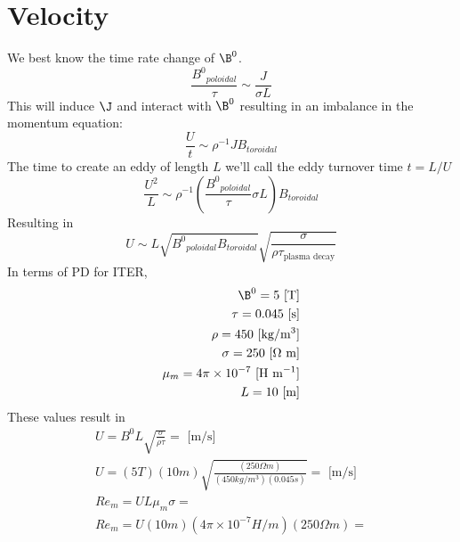 \documentclass[11pt]{article}
\begin{document}
\doublespacing
\MOONSTITLE
\maketitle

\section{Velocity}
We best know the time rate change of $\B^0$.
\begin{equation}
	\frac{{B^0}_{poloidal}}{\tau} \sim \frac{J}{\sigma L}
\end{equation}
This will induce $\J$ and interact with $\B^0$ resulting in an imbalance in the momentum equation:
\begin{equation}
	\frac{U}{t} \sim \rho^{-1} J B_{toroidal}
\end{equation}
The time to create an eddy of length $L$ we'll call the eddy turnover time $t=L/U$
\begin{equation}
	\frac{U^2}{L} \sim \rho^{-1} \left(\frac{{B^0}_{poloidal}}{\tau} \sigma L \right) B_{toroidal}
\end{equation}
Resulting in
\begin{equation}
	U \sim L \sqrt{{B^0}_{poloidal} B_{toroidal}} \sqrt{\frac{\sigma}{\rho \tau_{\text{plasma decay}}}}
\end{equation}
In terms of PD for ITER,
\begin{equation}\begin{aligned}
	\B^0 = 5 \text{ [T]} \\
	\tau = 0.045 \text{ [s]} \\
	\rho = 450 \text{ [kg/m$^3$]} \\
	\sigma = 250 \text{ [$\Omega$ m]} \\
	\mu_m = 4 \pi \times 10^{-7} \text{ [H m$^{-1}$]} \\
	L = 10 \text{ [m]} \\
\end{aligned}\end{equation}
These values result in
\begin{equation}\begin{aligned}
	U = B^0 L \sqrt{\frac{\sigma}{\rho \tau}} = \text{ [m/s]} \\
	U = (5 T) (10 m) \sqrt{\frac{(250 \Omega m)}{(450 kg/m^3) (0.045 s)}} = \text{ [m/s]} \\
	Re_m = U L \mu_m \sigma =  \\
	Re_m = U (10 m) (4 \pi \times 10^{-7} H/m) (250 \Omega m) =  \\
\end{aligned}\end{equation}
\end{document}
